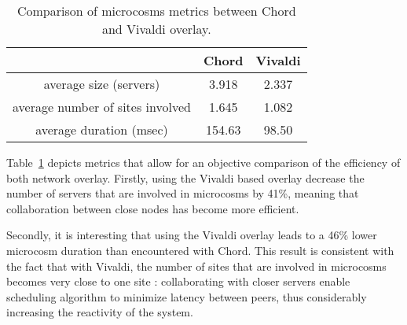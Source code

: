 \begin{table}

  \begin{center}
    \begin{tabular}{|c|c|c|}   

      \hline \multicolumn{1}{|p{3cm}|}{ }
       & \multicolumn{1}{|p{3cm}|}{\centering Chord }  & \multicolumn{1}{|p{3cm}|}{ \centering Vivaldi}  \\

      \hline
      average size (servers) & 3.918 & 2.337 \\

      \hline
      average number of sites involved & 1.645 & 1.082 \\

      \hline
      average duration (msec) & 154.63 & 98.50 \\

      \hline
    \end{tabular}
  \end{center}
  \caption{\label{microcosm_table} Comparison of microcosms metrics between Chord and Vivaldi overlay.}
\end{table}


Table~\ref{microcosm_table} depicts metrics that allow for an objective 
comparison of the efficiency of both network overlay. Firstly, using the Vivaldi
based overlay decrease the number of servers that are involved in microcosms by
41\%, meaning that collaboration between close nodes has become more efficient.

Secondly, it is interesting that using the Vivaldi overlay leads to a 46\% lower
microcosm duration than encountered with Chord. This result is consistent with 
the fact that with Vivaldi, the number of sites that are involved in microcosms
becomes very close to one site : collaborating with closer servers enable
scheduling algorithm to minimize latency between peers, thus considerably 
increasing the reactivity of the system.
% 
